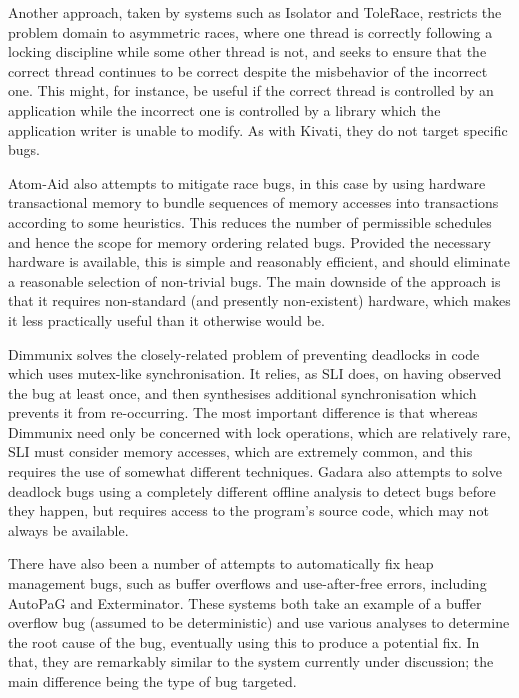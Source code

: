 \documentclass[10pt,letter,twocolumn]{sigplanconf}
\newcommand{\editorial}[1]{}
\begin{document}
Another approach, taken by systems such as Isolator
\cite{Ramalingam2009} and ToleRace\cite{Ratanaworabhan2008}, restricts
the problem domain to asymmetric races, where one thread is correctly
following a locking discipline while some other thread is not, and
seeks to ensure that the correct thread continues to be correct
despite the misbehavior of the incorrect one.  This might, for
instance, be useful if the correct thread is controlled by an
application while the incorrect one is controlled by a library which
the application writer is unable to modify.  As with Kivati, they do
not target specific bugs.\editorial{...}

Atom-Aid\cite{Lucia2009} also attempts to mitigate race bugs, in
this case by using hardware transactional memory to
bundle sequences of memory accesses into
transactions according to some heuristics.  This reduces the
number of permissible schedules and hence the scope for memory
ordering related bugs.  Provided the necessary hardware is available,
this is simple and reasonably efficient, and should eliminate a
reasonable selection of non-trivial bugs.  The main downside of the
approach is that it requires non-standard (and presently non-existent)
hardware, which makes it less practically useful than it otherwise
would be.

Dimmunix\cite{Jula2008} solves the closely-related problem of
preventing deadlocks in code which uses mutex-like synchronisation.
It relies, as SLI does, on having observed the bug at least once, and
then synthesises additional synchronisation which prevents it from
re-occurring.  The most important difference is that whereas Dimmunix
need only be concerned with lock operations, which are relatively
rare, SLI must consider memory accesses, which are extremely common,
and this requires the use of somewhat different techniques.
Gadara\cite{Wang2008} also attempts to solve deadlock bugs using a
completely different offline analysis to detect bugs before they
happen, but requires access to the program's source code, which may
not always be available.

There have also been a number of attempts to automatically fix heap
management bugs, such as buffer overflows and use-after-free errors,
including AutoPaG\cite{Lin2007} and Exterminator\cite{Novark2007}.
These systems both take an example of a buffer overflow bug (assumed
to be deterministic) and use various analyses to determine the root
cause of the bug, eventually using this to produce a potential fix.
In that, they are remarkably similar to the system currently under
discussion; the main difference being the type of bug targeted.
\end{document}
